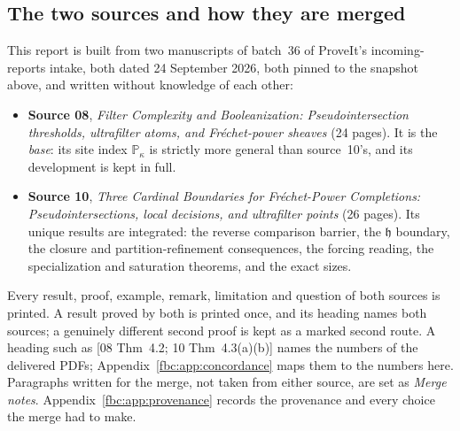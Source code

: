 \documentclass[11pt,letterpaper]{article}
\theoremstyle{definition}
\theoremstyle{remark}
\newcommand{\PP}{\mathbb P}
\newcommand{\ch}{\mathfrak h}
\newcommand{\src}[1]{\textup{[#1]}}
\begin{document}
\subsection{The two sources and how they are merged}
\label{fbc:sec:sources}
This report is built from two manuscripts of batch~36 of ProveIt's
incoming-reports intake, both dated 24 September 2026, both pinned to
the snapshot above, and written without knowledge of each other:
\begin{itemize}
\item \textbf{Source 08}, \emph{Filter Complexity and Booleanization:
Pseudointersection thresholds, ultrafilter atoms, and Fr\'echet-power
sheaves} (24 pages). It is the \emph{base}: its site index $\PP_\kappa$
is strictly more general than source~10's, and its development is kept
in full.
\item \textbf{Source 10}, \emph{Three Cardinal Boundaries for
Fr\'echet-Power Completions: Pseudointersections, local decisions, and
ultrafilter points} (26 pages). Its unique results are integrated: the
reverse comparison barrier, the $\ch$ boundary, the closure and
partition-refinement consequences, the forcing reading, the
specialization and saturation theorems, and the exact sizes.
\end{itemize}
Every result, proof, example, remark, limitation and question of both
sources is printed. A result proved by both is printed once, and its
heading names both sources; a genuinely different second proof is kept
as a marked second route. A heading such as
\src{08 Thm~4.2; 10 Thm~4.3(a)(b)} names the numbers of the delivered
PDFs; Appendix~\ref{fbc:app:concordance} maps them to the numbers here.
Paragraphs written for the merge, not taken from either source, are
set as \emph{Merge notes}. Appendix~\ref{fbc:app:provenance} records the
provenance and every choice the merge had to make.
\end{document}
